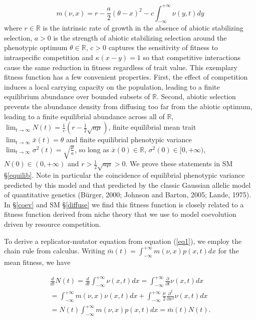 \documentclass[]{elsarticle} %
\begin{document}
\begin{equation}\label{special_m}
m(\nu,x)=r-\frac{a}{2}(\theta-x)^2-c\int_{-\infty}^{+\infty}\nu(y,t)dy
\end{equation} where \(r\in\mathbb{R}\) is the intrinsic rate of growth
in the absence of abiotic stabilizing selection, \(a>0\) is the strength
of abiotic stabilizing selection around the phenotypic optimum
\(\theta\in\mathbb{R}\), \(c>0\) captures the sensitivity of fitness to
intraspecific competition and \(\kappa(x-y)=1\) so that competitive
interactions cause the same reduction in fitness regardless of trait
value. This exemplary fitness function has a few convenient properties.
First, the effect of competition induces a local carrying capacity on
the population, leading to a finite equilibrium abundance over bounded
subsets of \(\mathbb{R}\). Second, abiotic selection prevents the
abundance density from diffusing too far from the abiotic optimum,
leading to a finite equilibrial abundance across all of \(\mathbb{R}\),
\(\lim_{t\to\infty}N(t)=\tfrac{1}{c}(r-\tfrac{1}{2}\sqrt{a\mu})\),
finite equilibrial mean trait \(\lim_{t\to\infty}\bar x(t)=\theta\) and
finite equilibrial phenotypic variance
\(\lim_{t\to\infty}\sigma^2(t)=\sqrt{\frac{\mu}{a}}\), so long as
\(\bar x(0)\in\mathbb{R}\), \(\sigma^2(0)\in[0,+\infty)\),
\(N(0)\in(0,+\infty)\) and \(r>\frac{1}{2}\sqrt{a\mu}>0\). We prove
these statements in SM \S\ref{equilib}. Note in particular the
coincidence of equilibrial phenotypic variance predicted by this model
and that predicted by the classic Gaussian allelic model of quantitative
genetics (Bürger, 2000; Johnson and Barton, 2005; Lande, 1975). In
\S\ref{coev} and SM \S\ref{diffuse} we find this fitness function is
closely related to a fitness function derived from niche theory that we
use to model coevolution driven by resource competition.

To derive a replicator-mutator equation from equation (\ref{eq1}), we
employ the chain rule from calculus. Writing
\(\bar m(t)=\int_{-\infty}^{+\infty}m(\nu,x)p(x,t)dx\) for the mean
fitness, we have

\begin{multline}\label{N_det}
\frac{d}{dt}N(t)=\frac{d}{dt}\int_{-\infty}^{+\infty}\nu(x,t)dx=\int_{-\infty}^{+\infty}\frac{\partial}{\partial t}\nu(x,t)dx \\
=\int_{-\infty}^{+\infty} m(\nu,x)\nu(x,t)dx+\int_{-\infty}^{+\infty}\frac{\mu}{2}\frac{\partial^2}{\partial x^2}\nu(x,t)dx \\
=N(t)\int_{-\infty}^{+\infty} m(\nu,x)p(x,t)dx=\bar m(t) N(t).
\end{multline}
\end{document}

